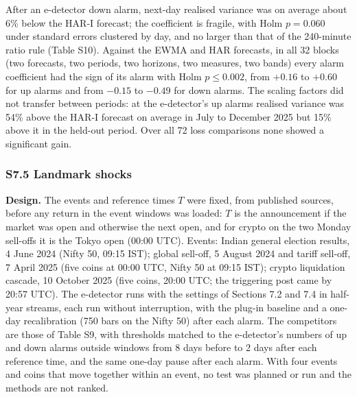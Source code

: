 \documentclass[
]{article}
\begin{document}
After an e-detector down alarm, next-day realised variance was on
average about 6\% below the HAR-I forecast; the coefficient is fragile,
with Holm \(p = 0.060\) under standard errors clustered by day, and no
larger than that of the 240-minute ratio rule (Table S10). Against the
EWMA and HAR forecasts, in all 32 blocks (two forecasts, two periods,
two horizons, two measures, two bands) every alarm coefficient had the
sign of its alarm with Holm \(p \le 0.002\), from \(+0.16\) to \(+0.60\)
for up alarms and from \(-0.15\) to \(-0.49\) for down alarms. The
scaling factors did not transfer between periods: at the e-detector's up
alarms realised variance was 54\% above the HAR-I forecast on average in
July to December 2025 but 15\% above it in the held-out period. Over all
72 loss comparisons none showed a significant gain.

\hypertarget{s7.5-landmark-shocks}{%
\subsubsection{S7.5 Landmark shocks}\label{s7.5-landmark-shocks}}

\textbf{Design.} The events and reference times \(T\) were fixed, from
published sources, before any return in the event windows was loaded:
\(T\) is the announcement if the market was open and otherwise the next
open, and for crypto on the two Monday sell-offs it is the Tokyo open
(00:00 UTC). Events: Indian general election results, 4 June 2024 (Nifty
50, 09:15 IST); global sell-off, 5 August 2024 and tariff sell-off, 7
April 2025 (five coins at 00:00 UTC, Nifty 50 at 09:15 IST); crypto
liquidation cascade, 10 October 2025 (five coins, 20:00 UTC; the
triggering post came by 20:57 UTC). The e-detector runs with the
settings of Sections 7.2 and 7.4 in half-year streams, each run without
interruption, with the plug-in baseline and a one-day recalibration (750
bars on the Nifty 50) after each alarm. The competitors are those of
Table S9, with thresholds matched to the e-detector's numbers of up and
down alarms outside windows from 8 days before to 2 days after each
reference time, and the same one-day pause after each alarm. With four
events and coins that move together within an event, no test was planned
or run and the methods are not ranked.
\end{document}

